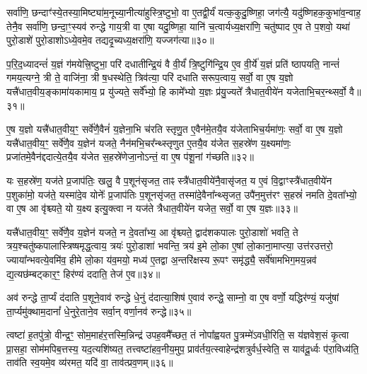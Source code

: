 {\anuvakamend[{अ॒स्मै॒ धा॒व॒ति॒ ता वा एक॑विꣳशतिश्च॥10॥}]}

सर्वा॑णि॒ छन्दाꣳ॑स्ये॒तस्या॒मिष्ट्या॑म॒नूच्या॒नीत्या॑हुस्त्रि॒ष्टुभो॒ वा ए॒तद्वी॒र्यं॑ यत्क॒कुदु॒ष्णिहा॒ जग॑त्यै॒ यदु॑ष्णिहक॒कुभा॑व॒न्वाह॒ तेनै॒व सर्वा॑णि॒ छन्दा॒ꣳ॒स्यव॑ रुन्द्धे गाय॒त्री वा ए॒षा यदु॒ष्णिहा॒ यानि॑ च॒त्वार्यध्य॒क्षरा॑णि॒ चतु॑ष्पाद ए॒व ते प॒शवो॒ यथा॑ पुरो॒डाशे॑ पुरो॒डाशो\-ऽध्ये॒वमे॒व तद्यदृ॒च्यध्य॒क्षरा॑णि॒ यज्जग॑त्या॥३०॥

प॒रि॒द॒ध्यादन्तं॑ य॒ज्ञं ग॑मयेत्त्रि॒ष्टुभा॒ परि॑ दधातीन्द्रि॒यं वै वी॒र्यं॑ त्रि॒ष्टुगि॑न्द्रि॒य ए॒व वी॒र्ये॑ य॒ज्ञं प्रति॑ ष्ठापयति॒ नान्तं॑ गमय॒त्यग्ने॒ त्री ते॒ वाजि॑ना॒ त्री ष॒धस्थेति॒ त्रिव॑त्या॒ परि॑ दधाति सरूप॒त्वाय॒ सर्वो॒ वा ए॒ष य॒ज्ञो यत्त्रै॑धात॒वीय॒ङ्कामा॑यकामाय॒ प्र यु॑ज्यते॒ सर्वे᳚भ्यो॒ हि कामे᳚भ्यो य॒ज्ञः प्र॑यु॒ज्यते᳚ त्रैधात॒वीये॑न यजेताभि॒चर॒न्थ्सर्वो॒ वै॥३१॥

ए॒ष य॒ज्ञो यत्त्रै॑धात॒वीय॒ꣳ॒ सर्वे॑णै॒वैनं॑ य॒ज्ञेना॒भि च॑रति स्तृणु॒त ए॒वैन॑मे॒तयै॒व य॑जेताभिच॒र्यमा॑णः॒ सर्वो॒ वा ए॒ष य॒ज्ञो यत्त्रै॑धात॒वीय॒ꣳ॒ सर्वे॑णै॒व य॒ज्ञेन॑ यजते॒ नैन॑मभि॒चर᳚न्थ्स्तृणुत ए॒तयै॒व य॑जेत स॒हस्रे॑ण य॒क्ष्यमा॑णः॒ प्रजा॑तमे॒वैन॑द्ददात्ये॒तयै॒व य॑जेत स॒हस्रे॑णेजा॒नो\-ऽन्तं॒ वा ए॒ष प॑शू॒नां ग॑च्छति॥३२॥

यः स॒हस्रे॑ण॒ यज॑ते प्र॒जाप॑तिः॒ खलु॒ वै प॒शून॑सृजत॒ ताꣴ स्त्रै॑धात॒वीये॑नै॒वासृ॑जत॒ य ए॒वं वि॒द्वाꣳस्त्रै॑धात॒वीये॑न प॒शुका॑मो॒ यज॑ते॒ यस्मा॑दे॒व योनेः᳚ प्र॒जाप॑तिः प॒शूनसृ॑जत॒ तस्मा॑दे॒वैना᳚न्थ्सृजत॒ उपै॑न॒मुत्त॑रꣳ स॒हस्रं॑ नमति दे॒वता᳚भ्यो॒ वा ए॒ष आ वृ॑श्च्यते॒ यो य॒क्ष्य इत्यु॒क्त्वा न यज॑ते त्रैधात॒वीये॑न यजेत॒ सर्वो॒ वा ए॒ष य॒ज्ञः॥३३॥

यत्त्रै॑धात॒वीय॒ꣳ॒ सर्वे॑णै॒व य॒ज्ञेन॑ यजते॒ न दे॒वता᳚भ्य॒ आ वृ॑श्च्यते॒ द्वाद॑शकपालः पुरो॒डाशो॑ भवति॒ ते त्रय॒श्चतु॑ष्कपालास्त्रिष्षमृद्ध॒त्वाय॒ त्रयः॑ पुरो॒डाशा॑ भवन्ति॒ त्रय॑ इ॒मे लो॒का ए॒षां लो॒काना॒माप्त्या॒ उत्त॑रउत्तरो॒ ज्याया᳚न्भवत्ये॒वमि॑व॒ हीमे लो॒का य॑व॒मयो॒ मध्य॑ ए॒तद्वा अ॒न्तरि॑क्षस्य रू॒पꣳ समृ॑द्ध्यै॒ सर्वे॑षामभिग॒मय॒न्नव॑ द्य॒त्यछ॑म्बट्कार॒ꣳ॒ हिर॑ण्यं ददाति॒ तेज॑ ए॒व॥३४॥

अव॑ रुन्द्धे ता॒र्प्यं द॑दाति प॒शूने॒वाव॑ रुन्द्धे धे॒नुं द॑दात्या॒शिष॑ ए॒वाव॑ रुन्द्धे॒ साम्नो॒ वा ए॒ष वर्णो॒ यद्धिर॑ण्यं॒ यजु॑षां ता॒र्प्यमु॑क्थाम॒दानां᳚ धे॒नुरे॒ताने॒व सर्वा॒न् वर्णा॒नव॑ रुन्द्धे॥३५॥

{\anuvakamend[{जग॑त्या\-ऽभि॒चर॒न्थ्सर्वो॒ वै ग॑च्छति य॒ज्ञस्तेज॑ ए॒व त्रि॒ꣳ॒शच्च॑॥11॥}]}

त्वष्टा॑ ह॒तपु॑त्रो॒ वीन्द्र॒ꣳ॒ सोम॒माह॑र॒त्तस्मि॒न्निन्द्र॑ उपह॒वमै᳚च्छत॒ तं नोपा᳚ह्वयत पु॒त्रम्मे॑\-ऽवधी॒रिति॒ स य॑ज्ञवेश॒सं कृ॒त्वा प्रा॒सहा॒ सोम॑मपिब॒त्तस्य॒ यद॒त्यशि॑ष्यत॒ तत्त्वष्टा॑हव॒नीय॒मुप॒ प्राव॑र्तय॒त्स्वाहेन्द्र॑शत्रुर्वर्ध॒स्वेति॒ स याव॑दू॒र्ध्वः प॑रा॒विध्य॑ति॒ ताव॑ति स्व॒यमे॒व व्य॑रमत॒ यदि॑ वा॒ ताव॑त्प्रव॒णम्॥३६॥

